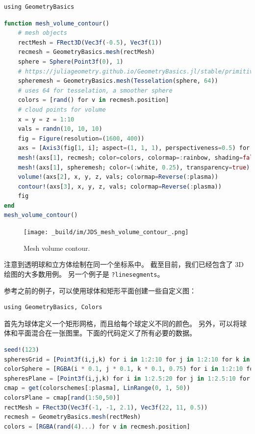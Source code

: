 \documentclass[
  notoc %
]{tufte-book}
\newcommand{\passthrough}[1]{#1}
\begin{document}
\begin{lstlisting}
using GeometryBasics
\end{lstlisting}

\begin{lstlisting}[language=Julia]
function mesh_volume_contour()
    # mesh objects
    rectMesh = FRect3D(Vec3f(-0.5), Vec3f(1))
    recmesh = GeometryBasics.mesh(rectMesh)
    sphere = Sphere(Point3f(0), 1)
    # https://juliageometry.github.io/GeometryBasics.jl/stable/primitives/
    spheremesh = GeometryBasics.mesh(Tesselation(sphere, 64))
    # uses 64 for tesselation, a smoother sphere
    colors = [rand() for v in recmesh.position]
    # cloud points for volume
    x = y = z = 1:10
    vals = randn(10, 10, 10)
    fig = Figure(resolution=(1600, 400))
    axs = [Axis3(fig[1, i]; aspect=(1, 1, 1), perspectiveness=0.5) for i = 1:3]
    mesh!(axs[1], recmesh; color=colors, colormap=:rainbow, shading=false)
    mesh!(axs[1], spheremesh; color=(:white, 0.25), transparency=true)
    volume!(axs[2], x, y, z, vals; colormap=Reverse(:plasma))
    contour!(axs[3], x, y, z, vals; colormap=Reverse(:plasma))
    fig
end
mesh_volume_contour()
\end{lstlisting}

\begin{figure}
\hypertarget{fig:mesh_volume_contour}{%
\centering
\texttt{[image: \_build/im/JDS\_mesh\_volume\_contour\_.png]}
\caption{Mesh volume contour.}\label{fig:mesh_volume_contour}
}
\end{figure}

注意到透明球和立方体绘制在同一个坐标系中。 截至目前，我们已经包含了 3D
绘图的大多数用例。 另一个例子是
\passthrough{\lstinline!?linesegments!}。

参考之前的例子，可以使用球体和矩形平面创建一些自定义图：

\begin{lstlisting}
using GeometryBasics, Colors
\end{lstlisting}

首先为球体定义一个矩形网格，而且给每个球定义不同的颜色。
另外，可以将球体和平面混合在一张图里。下面的代码定义了所有必要的数据。

\begin{lstlisting}[language=Julia]
seed!(123)
spheresGrid = [Point3f(i,j,k) for i in 1:2:10 for j in 1:2:10 for k in 1:2:10]
colorSphere = [RGBA(i * 0.1, j * 0.1, k * 0.1, 0.75) for i in 1:2:10 for j in 1:2:10 for k in 1:2:10]
spheresPlane = [Point3f(i,j,k) for i in 1:2.5:20 for j in 1:2.5:10 for k in 1:2.5:4]
cmap = get(colorschemes[:plasma], LinRange(0, 1, 50))
colorsPlane = cmap[rand(1:50,50)]
rectMesh = FRect3D(Vec3f(-1, -1, 2.1), Vec3f(22, 11, 0.5))
recmesh = GeometryBasics.mesh(rectMesh)
colors = [RGBA(rand(4)...) for v in recmesh.position]
\end{lstlisting}
\end{document}
